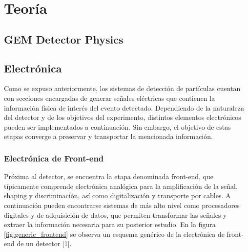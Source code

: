 \documentclass[]{book}
\begin{document}
\chapter*{Teoría}

\section{GEM Detector Physics}


\section{Electrónica}

\noindent Como se expuso anteriormente, los sistemas de detección de partículas cuentan con secciones encargadas de generar señales eléctricas que contienen la información física de interés del evento detectado. Dependiendo de la naturaleza del detector y de los objetivos del experimento, distintos elementos electrónicos pueden ser implementados a continuación. Sin embargo, el objetivo de estas etapas converge a preservar y transportar la mencionada información. \\

\subsection{Electrónica de Front-end}
\noindent Próxima al detector, se encuentra la etapa denominada front-end, que típicamente comprende electrónica analógica para la amplificación de la señal, shaping y discriminación, así como digitalización y transporte por cables. A continuación pueden encontrarse sistemas de más alto nivel como procesadores digitales y de adquisición de datos, que permiten transformar las señales y extraer la información necesaria para su posterior estudio. En la figura \ref{fig:generic_frontend} se observa un esquema genérico de la electrónica de front-end de un detector [1].
\end{document}
